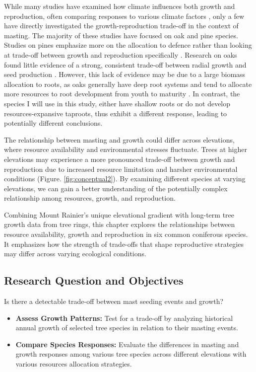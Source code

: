 \documentclass[11pt,letter]{article}
\begin{document}
While many studies have examined how climate influences both growth and reproduction, often comparing responses to various climate factors \citep{bajocco2021characterizing, koenig2020can, redmond2019resource, sanchez2011trade}, only a few have directly investigated the growth-reproduction trade-off in the context of masting. The majority of these studies have focused on oak and pine species. Studies on pines emphasize more on the allocation to defence rather than looking at trade-off between growth and reproduction specifically \citep{larrinaga2024resource, redmond2019resource}. Research on oaks found little evidence of a strong, consistent trade-off between radial growth and seed production \citep{koenig2020can, patterson2023acorn}. However, this lack of evidence may be due to a  large biomass allocation to roots, as oaks generally have deep root systems and tend to allocate more resources to root development from youth to maturity \citep{burns1990silvics}. In contrast, the species I will use in this study, either have shallow roots or do not develop resources-expansive taproots, thus exhibit a different response, leading to potentially different conclusions.\par

The relationship between masting and growth could differ across elevations, where resource availability and environmental stresses fluctuate. Trees at higher elevations may experience a more pronounced trade-off between growth and reproduction due to increased resource limitation and harsher environmental conditions (Figure. \ref{fig:conceptual2}). By examining different species at varying elevations, we can gain a better understanding of the potentially complex relationship among resources, growth, and reproduction.\par

Combining Mount Rainier's unique elevational gradient with long-term tree growth data from tree rings, this chapter explores the relationships between resource availability, growth and reproduction in six common coniferous species. It emphasizes how the strength of trade-offs that shape reproductive strategies may differ across varying ecological conditions.   %
\subsection{Research Question and Objectives}
Is there a detectable trade-off between mast seeding events and growth?
	\begin{itemize}
	\item \textbf{Assess Growth Patterns:} Test for a trade-off by analyzing historical annual growth of selected tree species in relation to their masting events.
	\item \textbf{Compare Species Responses:} Evaluate the differences in masting and growth responses among various tree species across different elevations with various resources allocation strategies.
	\end{itemize}
\end{document}

